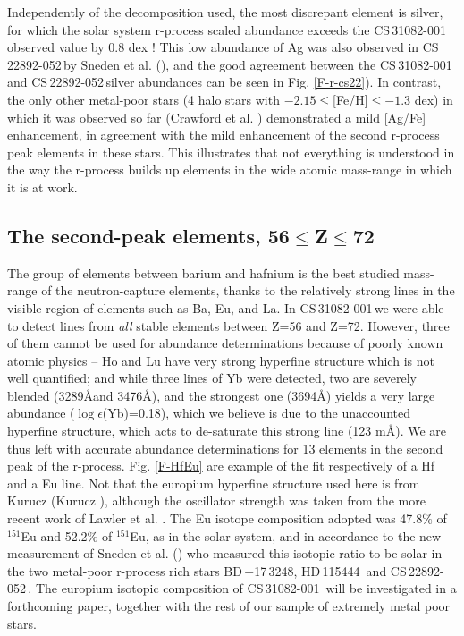 \documentclass{aa}
\def\cs{CS\,31082-001\,}
\def\sned{CS\,22892-052\,}
\def\hd115{HD\,115444\,}
\begin{document}
Independently of the decomposition used, the most
discrepant element is silver, for which the solar system r-process
scaled abundance exceeds the \cs observed value by 0.8 dex ! This low
abundance of Ag was also observed in \sned by Sneden et
al. (\cite{sneden00}), and the good agreement
between the \cs and \sned silver abundances can be seen 
in Fig. \ref{F-r-cs22}).
In contrast, the only other metal-poor stars (4 halo stars with
$-2.15\leq$[Fe/H]$\leq -1.3$ dex) in which it was observed so
far (Crawford et al. \cite{crawford98}) demonstrated a mild [Ag/Fe]
enhancement, in agreement with the mild enhancement of the second
r-process peak elements in these stars. This illustrates that not
everything is understood in the way the r-process builds up elements in
the wide atomic mass-range in which it is at work.

\subsection{The second-peak elements, 56$\leq$Z$\leq$72}\label{second-peak}

The group of elements between barium and hafnium is the best studied mass-range
of the neutron-capture elements, thanks to the relatively strong lines in the
visible region of elements such as Ba, Eu, and La. In \cs we were able to 
detect lines from {\it all} stable elements between Z=56 and Z=72. However,
three of them cannot be used for abundance determinations because of poorly
known atomic physics --  Ho and Lu have very strong hyperfine structure which
is not well quantified; and while three lines of Yb were detected, two
are severely blended (3289\AA and 3476\AA), and the strongest one
(3694\AA) yields a very large abundance ($\log\epsilon$(Yb)=0.18),
which we believe is due to the unaccounted hyperfine
structure, which acts to de-saturate this strong line (123 m\AA). 
We are thus left with accurate abundance determinations for 13
elements in the second peak of the r-process. 
Fig. \ref{F-HfEu} are example of the fit respectively of a Hf and
a Eu line. Not that the europium hyperfine structure used here is from
Kurucz (Kurucz \cite{kuruczcd}), although the oscillator strength was
taken from the more recent work of Lawler et
al. \cite{lawler01b}. The Eu isotope composition
adopted was 47.8$\%$ of $^{151}$Eu and 52.2$\%$ of 
$^{151}$Eu, as in the solar system, and in accordance to the new
measurement of Sneden et al. (\cite{snedenEu}) who measured this
isotopic ratio to be solar in the two metal-poor r-process rich stars
BD\,+17\,3248, \hd115 and \sned. The europium isotopic composition of \cs
will be investigated in a forthcoming paper, together with the rest of
our sample of extremely metal poor stars.
\end{document}
